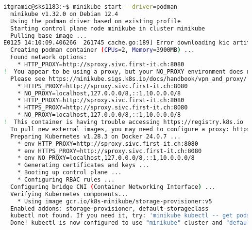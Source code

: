 \lstset{style=gra_codestyle}
\begin{lstlisting}[language=bash, caption=minikube / Podman gestartet,captionpos=b,label={lst:minikube-started-podman},breaklines=true]
itgramic@sks1183:~$ minikube start --driver=podman
  minikube v1.32.0 on Debian 12.4
  Using the podman driver based on existing profile
  Starting control plane node minikube in cluster minikube
  Pulling base image ...
E0125 14:10:09.406266  261745 cache.go:189] Error downloading kic artifacts:  not yet implemented, see issue #8426
  Creating podman container (CPUs=2, Memory=3900MB) ...
  Found network options:
    * HTTP_PROXY=http://sproxy.sivc.first-it.ch:8080
!  You appear to be using a proxy, but your NO_PROXY environment does not include the minikube IP (192.168.49.2).
  Please see https://minikube.sigs.k8s.io/docs/handbook/vpn_and_proxy/ for more details
    * HTTPS_PROXY=http://sproxy.sivc.first-it.ch:8080
    * NO_PROXY=localhost,127.0.0.0/8,::1,10.0.0.0/8
    * HTTP_PROXY=http://sproxy.sivc.first-it.ch:8080
    * HTTPS_PROXY=http://sproxy.sivc.first-it.ch:8080
    * NO_PROXY=localhost,127.0.0.0/8,::1,10.0.0.0/8
!  This container is having trouble accessing https://registry.k8s.io
  To pull new external images, you may need to configure a proxy: https://minikube.sigs.k8s.io/docs/reference/networking/proxy/
  Preparing Kubernetes v1.28.3 on Docker 24.0.7 ...
    * env HTTP_PROXY=http://sproxy.sivc.first-it.ch:8080
    * env HTTPS_PROXY=http://sproxy.sivc.first-it.ch:8080
    * env NO_PROXY=localhost,127.0.0.0/8,::1,10.0.0.0/8
    * Generating certificates and keys ...
    * Booting up control plane ...
    * Configuring RBAC rules ...
  Configuring bridge CNI (Container Networking Interface) ...
  Verifying Kubernetes components...
    * Using image gcr.io/k8s-minikube/storage-provisioner:v5
  Enabled addons: storage-provisioner, default-storageclass
  kubectl not found. If you need it, try: 'minikube kubectl -- get pods -A'
  Done! kubectl is now configured to use "minikube" cluster and "default" namespace by default
\end{lstlisting}


